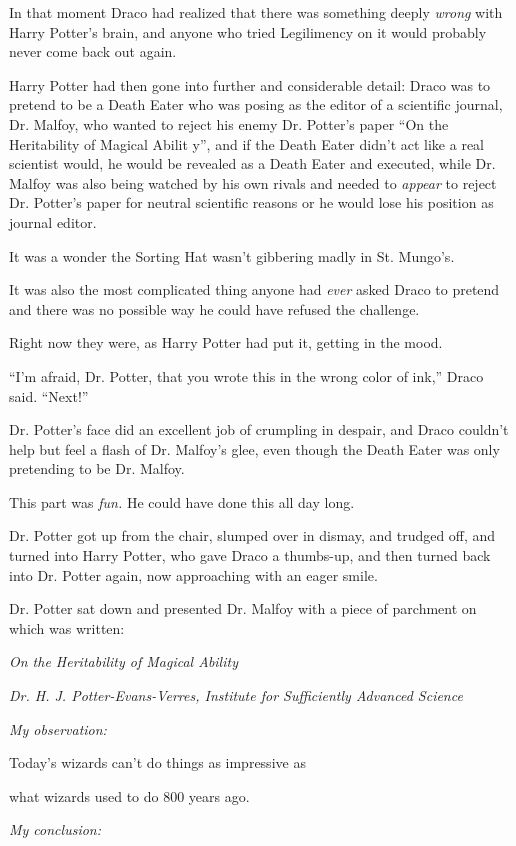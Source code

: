 In that moment Draco had realized that there was something deeply \emph{wrong} with Harry Potter's brain, and anyone who tried Legilimency on it would probably never come back out again.

Harry Potter had then gone into further and considerable detail: Draco was to pretend to be a Death Eater who was posing as the editor of a scientific journal, Dr. Malfoy, who wanted to reject his enemy Dr. Potter's paper ``On the Heritability of Magical Abilit y'', and if the Death Eater didn't act like a real scientist would, he would be revealed as a Death Eater and executed, while Dr. Malfoy was also being watched by his own rivals and needed to \emph{appear} to reject Dr. Potter's paper for neutral scientific reasons or he would lose his position as journal editor.

It was a wonder the Sorting Hat wasn't gibbering madly in St. Mungo's.

It was also the most complicated thing anyone had \emph{ever} asked Draco to pretend and there was no possible way he could have refused the challenge.

Right now they were, as Harry Potter had put it, getting in the mood.

``I'm afraid, Dr. Potter, that you wrote this in the wrong color of ink,'' Draco said. ``Next!''

Dr. Potter's face did an excellent job of crumpling in despair, and Draco couldn't help but feel a flash of Dr. Malfoy's glee, even though the Death Eater was only pretending to be Dr. Malfoy.

This part was \emph{fun.} He could have done this all day long.

Dr. Potter got up from the chair, slumped over in dismay, and trudged off, and turned into Harry Potter, who gave Draco a thumbs-up, and then turned back into Dr. Potter again, now approaching with an eager smile.

Dr. Potter sat down and presented Dr. Malfoy with a piece of parchment on which was written:

\emph{On the Heritability of Magical Ability}

\emph{Dr. H. J. Potter-Evans-Verres, Institute for Sufficiently Advanced Science}

\emph{My observation:}

Today's wizards can't do things as impressive as

what wizards used to do 800 years ago.

\emph{My conclusion:}

